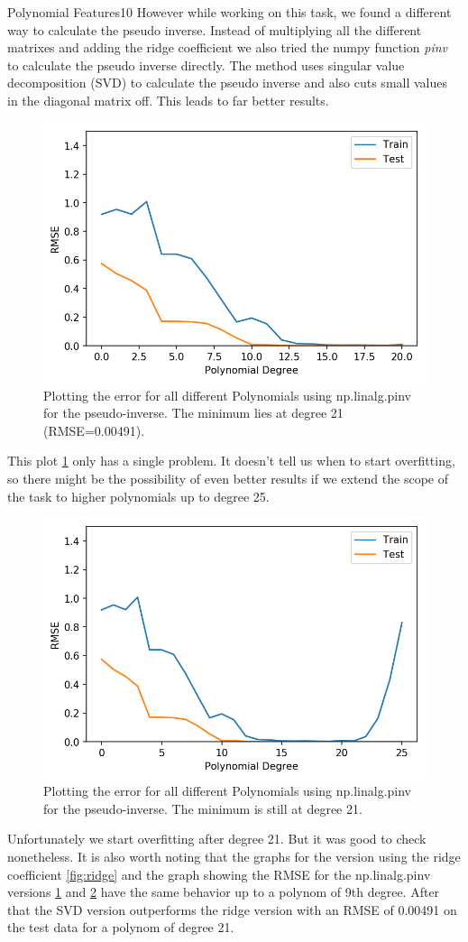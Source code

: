 \begin{questions}
\begin{question}{Polynomial Features}{10}
However while working on this task, we found a different way to calculate the pseudo inverse. Instead of multiplying all the different matrixes and adding the ridge coefficient we also tried the numpy function \textit{pinv} to calculate the pseudo inverse directly. The method uses singular value decomposition (SVD) to calculate the pseudo inverse and also cuts small values in the diagonal matrix off. This leads to far better results.
 \begin{figure}[H]
 	\includegraphics[width=0.6\linewidth]{pictures/polynomial_regression_our_version.png}
 	\centering
 	\caption{Plotting the error for all different Polynomials using np.linalg.pinv for the pseudo-inverse. The minimum lies at degree 21 (RMSE=0.00491).}
 	\label{fig:pinv1}
 \end{figure}
This plot \ref{fig:pinv1} only has a single problem. It doesn't tell us when to start overfitting, so there might be the possibility of even better results if we extend the scope of the task to higher polynomials up to degree 25.
 \begin{figure}[H]
	\includegraphics[width=0.6\linewidth]{pictures/polynomial_regression_our_version_degree_26.png}
	\centering
	\caption{Plotting the error for all different Polynomials using np.linalg.pinv for the pseudo-inverse. The minimum is still at degree 21.}
	\label{fig:pinv2}
\end{figure}
Unfortunately we start overfitting after degree 21. But it was good to check nonetheless. It is also worth noting that the graphs for the version using the ridge coefficient \ref{fig:ridge} and the graph showing the RMSE for the np.linalg.pinv versions \ref{fig:pinv1} and \ref{fig:pinv2} have the same behavior up to a polynom of 9th degree. After that the SVD version outperforms the ridge version with an RMSE of 0.00491 on the test data for a polynom of degree 21.


\end{question}
\end{questions}
